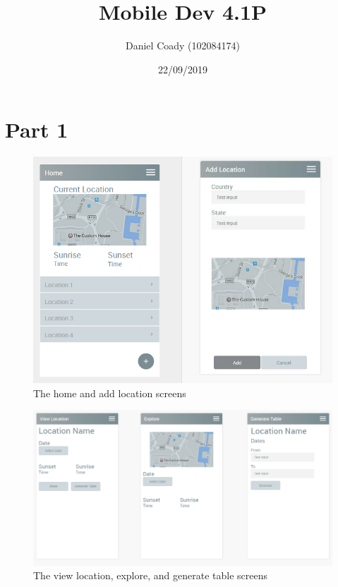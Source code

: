 \documentclass{scrartcl}
\title{Mobile Dev 4.1P}
\author{Daniel Coady (102084174)}
\date{22/09/2019}
\begin{document}
\maketitle

\section*{Part 1}
\begin{figure}[h]
    \centering
    \includegraphics[scale=0.8]{images/screen1.png}
    \caption{The home and add location screens}
\end{figure}

\pagebreak

\begin{figure}[h]
    \centering
    \includegraphics[scale=0.55]{images/screen2.png}
    \caption{The view location, explore, and generate table screens}
\end{figure}
\end{document}
